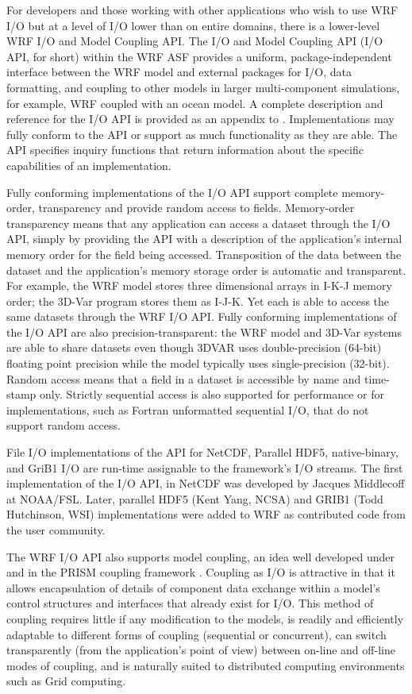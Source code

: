 For developers and those working with other applications who wish to
use WRF I/O but at a level of I/O lower than on entire domains, there is
a lower-level WRF I/O and Model Coupling API.  The I/O and Model
Coupling API (I/O API, for short) within the WRF ASF provides a
uniform, package-independent interface between the WRF model and
external packages for I/O, data formatting, and coupling to other
models in larger multi-component simulations, for example, WRF coupled
with an ocean model.  A complete description and reference for the I/O
API is provided as an appendix to \citet{michalak03}. Implementations may
fully conform to the API or support as much functionality as they are
able.  The API specifies inquiry functions that return information
about the specific capabilities of an implementation.

Fully conforming implementations of the I/O API support complete
memory-order, transparency and provide random access to fields.
Memory-order transparency means that any application can access a
dataset through the I/O API, simply by providing the API with a
description of the application's internal memory order for the field
being accessed. Transposition of the data between the dataset and the
application's memory storage order is automatic and transparent. For
example, the WRF model stores three dimensional arrays in I-K-J memory
order; the 3D-Var program stores them as I-J-K.  Yet each is able to
access the same datasets through the WRF I/O API.  Fully conforming
implementations of the I/O API are also precision-transparent: the WRF
model and 3D-Var systems are able to share datasets even though 3DVAR
uses double-precision (64-bit) floating point precision while the model
typically uses single-precision (32-bit).  Random access means that a
field in a dataset is accessible by name and time-stamp only. Strictly
sequential access is also supported for performance or for
implementations, such as Fortran unformatted sequential I/O, that do not
support random access.

File I/O implementations of
the API for NetCDF, Parallel HDF5, native-binary, and GriB1 I/O are
run-time assignable to the framework's I/O streams.  The first
implementation of the I/O API, in NetCDF was developed by Jacques
Middlecoff at NOAA/FSL. Later, parallel HDF5 (Kent Yang, NCSA) and
GRIB1 (Todd Hutchinson, WSI) implementations were added to WRF as
contributed code from the user community.

The WRF I/O API also
supports model coupling, an idea well developed under \citet{coats99}
and in the PRISM coupling framework \citep{guilyardi02}.  Coupling as
I/O is attractive in that it allows encapsulation of details of
component data exchange within a model's control structures and
interfaces that already exist for I/O.  This method of coupling requires little if any
modification to the models, is readily and efficiently
adaptable to different forms of coupling (sequential or concurrent), 
can switch transparently (from the application's point of view) between
on-line and off-line modes of coupling, and is naturally suited to
distributed computing environments such as Grid computing.

